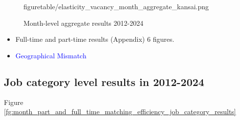 \documentclass[12pt]{article}
\begin{document}
\begin{figure}[!ht]
\begin{center}
{  {figuretable/elasticity_vacancy_month_aggregate_kansai.png}}
  \\
  \caption{Month-level aggregate results 2012-2024}
  \label{fg:month_part_and_full_time_elasticity_vacancy_month_aggregate_prefecture_results} 
  \end{center}
  \footnotesize
\end{figure} 

\begin{itemize}
    \item Full-time and part-time results (Appendix) 6 figures.
    \item \textcolor{blue}{Geographical Mismatch}
\end{itemize}

\subsection{Job category level results in 2012-2024}

Figure \ref{fg:month_part_and_full_time_matching_efficiency_job_category_results}
\end{document}
